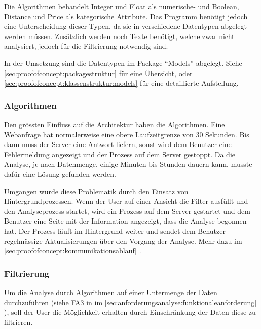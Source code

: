 Die Algorithmen behandelt Integer und Float als numerische- und Boolean, Distance und Price als kategorische Attribute. Das Programm benötigt jedoch eine Unterscheidung dieser Typen, da sie in verschiedene Datentypen abgelegt werden müssen. Zusätzlich werden noch Texte benötigt, welche zwar nicht analysiert, jedoch für die Filtrierung notwendig sind.

In der Umsetzung sind die Datentypen im Package "`Models"' abgelegt. Siehe \cref{sec:proofofconcept:packagestruktur}  für eine Übersicht, oder \cref{sec:proofofconcept:klassenstruktur:models}  für eine detaillierte Aufstellung.

\subsubsection{Algorithmen}
\label{sec:proofofconcept:architektur:anforderungen:algorithmen}
Den grössten Einfluss auf die Architektur haben die Algorithmen. Eine Webanfrage hat normalerweise eine obere Laufzeitgrenze von 30 Sekunden. Bis dann muss der Server eine Antwort liefern, sonst wird dem Benutzer eine Fehlermeldung angezeigt und der Prozess auf dem Server gestoppt. Da die Analyse, je nach Datenmenge, einige Minuten bis Stunden dauern kann, musste dafür eine Lösung gefunden werden. 

Umgangen wurde diese Problematik durch den Einsatz von Hintergrundprozessen. Wenn der User auf einer Ansicht die Filter ausfüllt und den Analyseprozess startet, wird ein Prozess auf dem Server gestartet und dem Benutzer eine Seite mit der Information angezeigt, dass die Analyse begonnen hat. Der Prozess läuft im Hintergrund weiter und sendet dem Benutzer regelmässige Aktualisierungen über den Vorgang der Analyse. Mehr dazu im \cref{sec:proofofconcept:kommunikationsablauf} .

\subsubsection{Filtrierung}
\label{sec:proofofconcept:architektur:anforderungen:filtrierung}
Um die Analyse durch Algorithmen auf einer Untermenge der Daten durchzuführen (siehe FA3 in im \cref{sec:anforderungsanalyse:funktionaleanforderung} ), soll der User die Möglichkeit erhalten durch Einschränkung der Daten diese zu filtrieren. 

